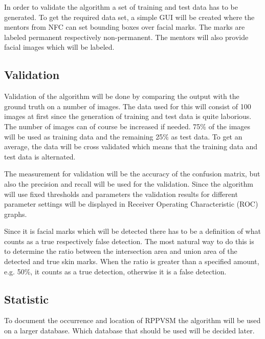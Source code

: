 In order to validate the algorithm a set of training and test data has to be generated. To get the required data set, a simple GUI will be created where the mentors from NFC can set bounding boxes over facial marks. The marks are labeled permanent respectively non-permanent. The mentors will also provide facial images which will be labeled.      

\subsection{Validation}

Validation of the algorithm will be done by comparing the output with the ground truth on a number of images. The data used for this will consist of 100 images at first since the generation of training and test data is quite laborious. The number of images can of course be increased if needed. 75\% of the images will be used as training data and the remaining 25\% as test data. To get an average, the data will be cross validated which means that the training data and test data is alternated. 

The measurement for validation will be the accuracy of the confusion matrix, but also the precision and recall will be used for the validation. Since the algorithm will use fixed thresholds and parameters the validation results for different parameter settings will be displayed in Receiver Operating Characteristic (ROC) graphs.

Since it is facial marks which will be detected there has to be a definition of what counts as a true respectively false detection. The most natural way to do this is to determine the ratio between the intersection area and union area of the detected and true skin marks. When the ratio is greater than a specified amount, e.g. 50\%, it counts as a true detection, otherwise it is a false detection. 


\subsection{Statistic}

To document the occurrence and location of RPPVSM the algorithm will be used on a larger database. Which database that should be used will be decided later.     
